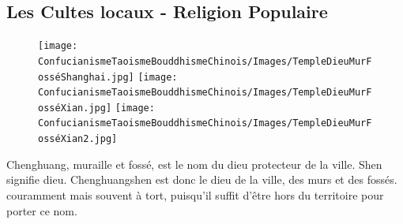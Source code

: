  
\subsection{Les Cultes locaux - Religion Populaire}

\begin{Ex}

    \begin{figure}[!h]
        \centering
                \texttt{[image: ConfucianismeTaoismeBouddhismeChinois/Images/TempleDieuMurFosséShanghai.jpg]}
    \texttt{[image: ConfucianismeTaoismeBouddhismeChinois/Images/TempleDieuMurFosséXian.jpg]}
        \texttt{[image: ConfucianismeTaoismeBouddhismeChinois/Images/TempleDieuMurFosséXian2.jpg]}

        

        \label{fig:enter-label}
    \end{figure}
    Chenghuang, muraille et fossé, est le nom du dieu protecteur de la ville. Shen signifie dieu. Chenghuangshen est donc le dieu de la ville, des murs et des fossés. couramment mais souvent à tort, puisqu'il suffit d'être hors du territoire pour porter ce nom.
\end{Ex}

